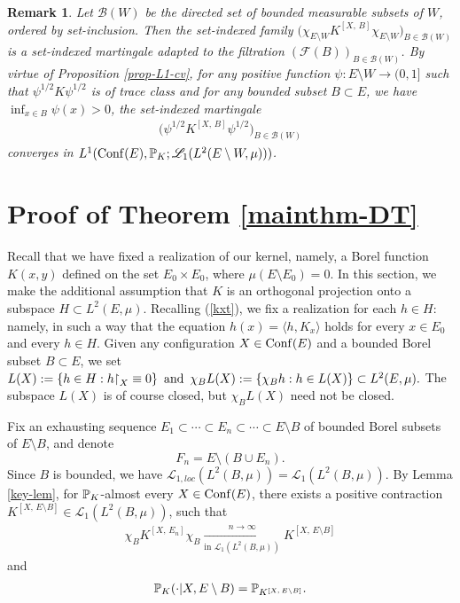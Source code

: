 \documentclass[12pt]{paper}
\newtheorem*{remark*}{Remark}
\numberwithin{theorem}{section}
\numberwithin{figure}{section}
\numberwithin{equation}{section}
\begin{document}
\begin{remark*}
Let $\mathscr{B}(W)$ be the directed set of bounded measurable subsets of  $W$, ordered by set-inclusion. Then the  set-indexed family $\big( \chi_{E\setminus W}  K^{[X, \, B]} \chi_{E\setminus W}  \big)_{B \in \mathscr{B}(W)}$
is a set-indexed martingale adapted to the filtration $(\mathcal{F}(B))_{B \in \mathscr{B}(W)}$. By virtue of Proposition \ref{prop-L1-cv},  for any positive function $\psi: E\setminus W \rightarrow (0, 1]$ such that $\psi^{1/2}K \psi^{1/2} $ is of trace class and for any bounded subset $B\subset E$, we have $\inf_{x\in B} \psi(x)>0$,  the set-indexed martingale
\begin{align*}
\Big( \psi^{1/2} K^{[X, \, B]} \psi^{1/2}  \Big)_{B\in \mathscr{B}(W)}
\end{align*}
converges in $L^1(\mathrm{Conf}(E), \mathbb{P}_K; \mathscr{L}_{1}(L^2(E\setminus W, \mu)))$.
\end{remark*}







\section{Proof of Theorem \ref{mainthm-DT}}

Recall  that  we have fixed a realization of our kernel, namely, a Borel function $K(x,y)$  defined on the set $E_0\times E_0$, where $\mu(E\setminus E_0)=0$.
In this section, we make the additional assumption that $K$ is an orthogonal projection onto a subspace $H\subset L^2(E, \mu)$.  Recalling (\ref{kxt}),
we fix a realization for each $h\in H$: namely, in such a way that  the equation
$h(x) = \langle h, K_x\rangle$ holds  for every $x\in E_0$ and every $h\in H$.
 Given any configuration $X \in \mathrm{Conf}(E)$ and a bounded Borel subset $B\subset E$, we set
$
 L(X)  : = \{ h \in H:      h\mathord{\upharpoonright}_X \equiv  0 \} \text{\, and \,}
\chi_B L (X) := \{  \chi_B h : h \in L(X)\} \subset L^2(E, \mu).
$
The subspace $L(X)$ is of course closed, but  $\chi_B L (X) $ need not be closed.



Fix an exhausting sequence $E_1 \subset \cdots \subset E_n \subset \cdots \subset E\setminus B$ of bounded Borel subsets of $E\setminus B$, and denote
$$
F_n = E \setminus (B \cup E_n).
$$
Since $B$ is bounded, we have
$
\mathscr{L}_{1, loc}(L^2(B, \mu)) = \mathscr{L}_{1}(L^2(B, \mu)).
$
By Lemma \ref{key-lem},  for $\mathbb{P}_K$-almost every $X\in \mathrm{Conf}(E)$,  there exists a positive contraction $K^{[X, \, E\setminus B]} \in \mathscr{L}_{1}(L^2(B, \mu))$, such that
\begin{align}\label{berg-limit}
\chi_{B} K^{[X, \, E_n]} \chi_{B} \xrightarrow[\text{in $\mathscr{L}_{1}(L^2(B, \mu))$}]{n\to\infty}  K^{[X, \, E \setminus B]}
\end{align}
and
\begin{align}\label{berg-cond}
\mathbb{P}_K(\cdot | X, E\setminus B) = \mathbb{P}_{K^{[X, \, E \setminus B]}}.
\end{align}
\end{document}
